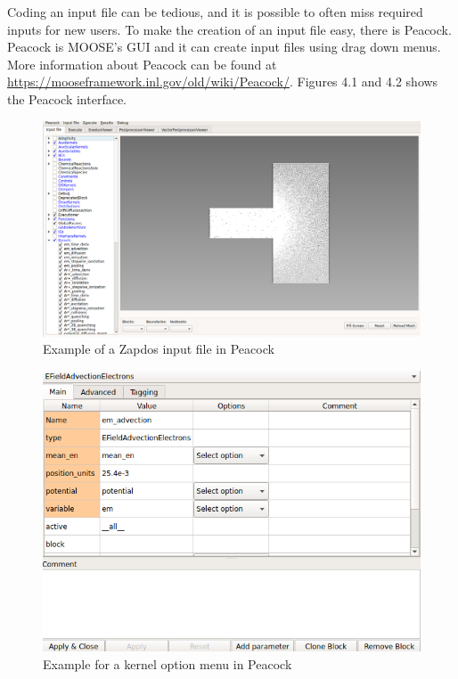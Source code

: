 \documentclass[final]{report}
\begin{document}
  Coding an input file can be tedious, and it is possible to often miss required inputs for new users. To make the creation of an input file easy, there is Peacock. Peacock is MOOSE's GUI and it can create input files using drag down menus. More information about Peacock can be found at \\
  \url{https://mooseframework.inl.gov/old/wiki/Peacock/}. Figures 4.1 and 4.2 shows the Peacock interface.


\begin{figure}[h]
  \centering
  \includegraphics[scale=0.35]{zapdos_content/media/Zapdos_Peacock.png}
  \caption{Example of a Zapdos input file in Peacock}
\end{figure}

\begin{figure}[!h]
  \centering
  \includegraphics[scale=0.5]{zapdos_content/media/em_advection_peacock}
  \caption{Example for a kernel option menu in Peacock}
\end{figure}
\end{document}
